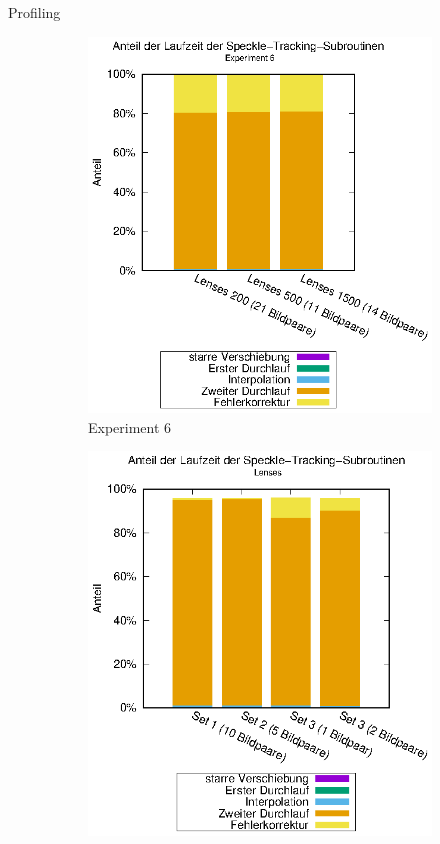 \begin{frame}[allowframebreaks]{Profiling}
\begin{center}
		\framebreak
		\begin{figure}[h]
			\hspace{-0.6cm}
			\begin{subfigure}[b]{0.45\linewidth}
				\centering
				\includegraphics[width=\linewidth]{pdf/speckle_exp6.eps}
				\caption{Experiment 6}
			\end{subfigure}
			\hspace{-0.9cm}
			\begin{subfigure}[b]{0.45\linewidth}
				\centering
				\includegraphics[width=\linewidth]{pdf/speckle_lenses.eps}

\end{subfigure}
\end{figure}
\end{center}
\end{frame}
